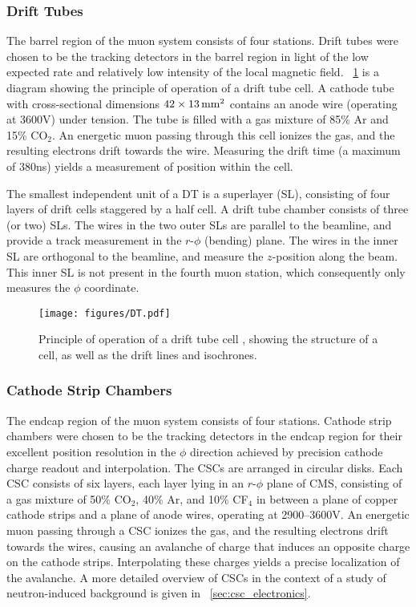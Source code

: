 \subsubsection{Drift Tubes}
The barrel region of the muon system consists of four stations.
Drift tubes were chosen to be the tracking detectors in the barrel region in light of the low expected rate and relatively low intensity of the local magnetic field.
\Fig~\ref{cms:dt} is a diagram showing the principle of operation of a drift tube cell.
A cathode tube with cross-sectional dimensions $42 \times 13 \,\text{mm}^2$ contains an anode wire (operating at 3600\unit{V}) under tension.
The tube is filled with a gas mixture of 85\% Ar and 15\% CO$_2$.
An energetic muon passing through this cell ionizes the gas, and the resulting electrons drift towards the wire.
Measuring the drift time (a maximum of 380\unit{ns}) yields a measurement of position within the cell.

The smallest independent unit of a DT is a superlayer (SL), consisting of four layers of drift cells staggered by a half cell.
A drift tube chamber consists of three (or two) SLs.
The wires in the two outer SLs are parallel to the beamline, and provide a track measurement in the $r$-$\phi$ (bending) plane.
The wires in the inner SL are orthogonal to the beamline, and measure the $z$-position along the beam.
This inner SL is not present in the fourth muon station, which consequently only measures the $\phi$ coordinate.

\begin{figure}[tpb]
  \centering
  \texttt{[image: figures/DT.pdf]}
  \caption{Principle of operation of a drift tube cell \cite{Chatrchyan:2013sba}, showing the structure of a cell, as well as the drift lines and isochrones.}
  \label{cms:dt}
\end{figure}

\subsubsection{Cathode Strip Chambers}
The endcap region of the muon system consists of four stations.
Cathode strip chambers were chosen to be the tracking detectors in the endcap region for their excellent position resolution in the $\phi$ direction achieved by precision cathode charge readout and interpolation.
The CSCs are arranged in circular disks.
Each CSC consists of six layers, each layer lying in an $r$-$\phi$ plane of CMS, consisting of a gas mixture of 50\% CO$_2$, 40\% Ar, and 10\% CF$_4$ in between a plane of copper cathode strips and a plane of anode wires, operating at 2900--3600\unit{V}.
An energetic muon passing through a CSC ionizes the gas, and the resulting electrons drift towards the wires, causing an avalanche of charge that induces an opposite charge on the cathode strips.
Interpolating these charges yields a precise localization of the avalanche.
A more detailed overview of CSCs in the context of a study of neutron-induced background is given in \Sec~\ref{sec:csc_electronics}.

